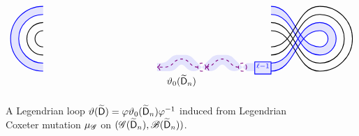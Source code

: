 \begin{figure}[ht]
\[\begin{tikzcd}[row sep=2pc]
\begin{tikzpicture}[baseline=-.5ex, scale=0.6]
\begin{scope}[xshift=7cm]
\draw[thick, blue, fill=blue!10] (-1, -2.175) rectangle ++(1, 0.75) node[pos=.5] {$\scriptstyle \ell-1$};
\fill[blue, opacity=0.1] (-7, -2) [rounded corners]-- ++(0.5, 0) -- ++(0.5, 0) -- ++(0.5, 0.5) -- ++(0.5, -0.5) -- ++(0.5, 0) [sharp corners]-- ++(0.25, 0.25) 
[rounded corners]-- ++(-0.75, 0.75) -- ++(-1, 0) -- ++(-0.5, -0.5) -- ++(-0.5, 0);
\fill[blue, opacity=0.1] (-4.25, -1.75) [rounded corners]-- ++(0.75, 0.75) -- ++(1, 0) [sharp corners]-- ++(0.75, -0.75)
[rounded corners]-- ++(-0.25, -0.25) -- ++(-0.5, 0) -- ++(-0.5, 0.5) -- ++(-0.5, -0.5) -- ++(-0.5, 0) -- ++(-0.25, 0.25);
\fill[blue, opacity=0.1] (-1, -1.5) -- ++(-0.5, 0) -- ++(-0.25, -0.25) -- ++(0.25, -0.25) -- ++(0.5, 0);
%
\draw[thick, violet, dashed] 
(-4.25, -1.75) circle (0.25)
(-1.75, -1.75) circle (0.25)
;
\draw[thick, violet, dashed, ->, rounded corners]
(-2, -1.75) -- ++(-0.25, 0) -- ++(-0.5, 0.5) -- ++(-0.5, 0) -- ++(-0.5, -0.5) -- ++(-0.25, 0);
\draw[thick, violet, dashed, ->, rounded corners]
(-4.5, -1.75) -- ++(-0.25, 0) -- ++(-0.5, 0.5) -- ++(-0.5, 0) -- ++(-0.5, -0.5) -- ++(-0.75, 0);
%
\end{scope}
\draw[thick] (-7, 0.5) arc (90:270:0.5) (-7, 1) arc (90:270:1);
\draw[thick, blue] (-7, 1.5) arc (90:270:1.5) (-7, 2) arc (90:270:2);
\fill[blue, opacity=0.1] (-7, 1.5) arc (90:270:1.5) -- (-7, -2) arc (-90:-270:2);
\begin{scope}
\draw[thick] (7, 1) to[out=0, in=180] ++(3, -2.5) (7, 0.5) to[out=0, in=180] ++(3, -2.5);
\draw[thick, blue] (7, 2) to[out=0, in=180] ++(3, -2.5) (7, 1.5) to[out=0, in=180] ++(3, -2.5);
\fill[blue, opacity=0.1] (7, 2) to[out=0, in=180] ++(3, -2.5) -- (10, -1) to[out=180, in=0] ++(-3, 2.5);
\end{scope}
\begin{scope}[yscale=-1]
\draw[thick] (7, 1) to[out=0, in=180] ++(3, -2.5) (7, 0.5) to[out=0, in=180] ++(3, -2.5);
\draw[thick, blue] (7, 2) to[out=0, in=180] ++(3, -2.5) (7, 1.5) to[out=0, in=180] ++(3, -2.5);
\fill[blue, opacity=0.1] (7, 2) to[out=0, in=180] ++(3, -2.5) -- (10, -1) to[out=180, in=0] ++(-3, 2.5);
\end{scope}
\draw[thick] (10, 2) arc (90:-90:2) (10, 1.5) arc (90:-90:1.5);
\draw[thick, blue] (10, 1) arc (90:-90:1) (10, 0.5) arc (90:-90:0.5);
\fill[blue, opacity=0.1] (10, 1) arc (90:-90:1) -- ++(0, 0.5) arc (-90:90:0.5);
%
\draw (1.5,-2) node[below] {$\vartheta_0(\exdynD_n)$};
\end{tikzpicture}
\end{tikzcd}
\]

\caption{A Legendrian loop $\vartheta(\widetilde{\mathsf{D}})=\varphi\vartheta_0(\widetilde{\mathsf{D}}_n)\varphi^{-1}$ induced from Legendrian Coxeter mutation $\mu_\mathscr{G}$ on $(\mathscr{G}(\widetilde{\mathsf{D}}_n),\mathscr{B}(\widetilde{\mathsf{D}}_n))$.}
\label{fig:legendrian loop of D_intro}
\end{figure}

